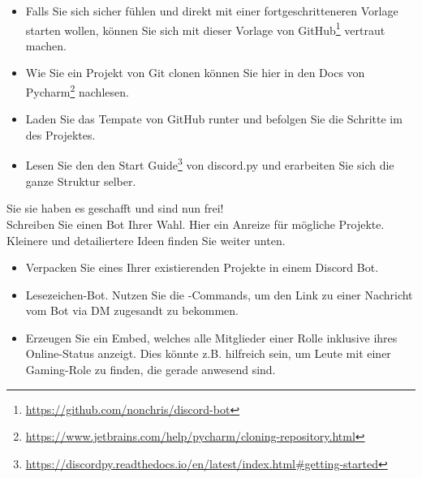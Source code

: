 \documentclass{config/minimal_uebungszettel}
\theoremstyle{definition}
\newcommand{\pp}[1]{\lpl{#1}}
\newcommand{\furl}[1]{\footnote{\url{#1}}}
\begin{document}
\begin{aufg}
		\begin{itemize}
			\item Falls Sie sich sicher fühlen und direkt mit einer fortgeschritteneren Vorlage starten wollen, können Sie sich mit dieser Vorlage von GitHub\furl{https://github.com/nonchris/discord-bot} vertraut machen.
			\item Wie Sie ein Projekt von Git clonen können Sie hier in den Docs von Pycharm\furl{https://www.jetbrains.com/help/pycharm/cloning-repository.html} nachlesen.\\
			\item Laden Sie das Tempate von GitHub runter und befolgen Sie die Schritte im \pp{README} des Projektes.
		\end{itemize}

        \noindent{} \quad
		
		\begin{itemize}
			\item Lesen Sie den den Start Guide\furl{https://discordpy.readthedocs.io/en/latest/index.html\#getting-started} von discord.py und erarbeiten Sie sich die ganze Struktur selber.
		\end{itemize}
	\end{aufg}
	
	\pagebreak
	
	\noindent {} \quad
	
	\noindent Sie sie haben es geschafft und sind nun frei!\\
	Schreiben Sie einen Bot Ihrer Wahl. Hier ein Anreize für mögliche Projekte. Kleinere und detailiertere Ideen finden Sie weiter unten.
	
	\begin{itemize}
		
		\item Verpacken Sie eines Ihrer existierenden Projekte in einem Discord Bot.
		
		\item Lesezeichen-Bot. Nutzen Sie die \pp{Context}-Commands, um den Link zu einer Nachricht vom Bot via DM zugesandt zu bekommen.
		
		\item Erzeugen Sie ein Embed, welches alle Mitglieder einer Rolle inklusive ihres Online-Status anzeigt. Dies könnte z.B. hilfreich sein, um Leute mit einer Gaming-Role zu finden, die gerade anwesend sind.

	\end{itemize}
	
	\noindent {} \quad
		
\end{document}
